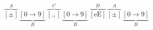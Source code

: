 \documentclass{article}
\begin{document}
$$\overbrace{[\pm]}^{A}\, \underbrace{[0\to9]}_{B}\, \overbrace{[.,]}^{C} \,\underbrace{[0\to9]}_{B}\, 
\overbrace{[\mathrm{eE}]}^{D}\, \overbrace{[\pm]}^{A}\, \underbrace{[0\to9]}_{B}$$
\end{document}
